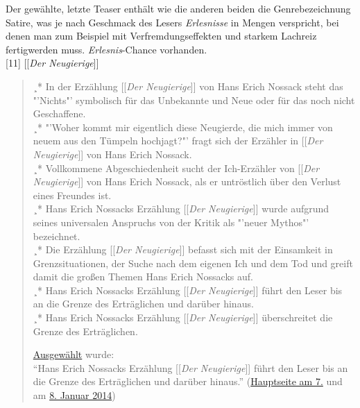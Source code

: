 \documentclass[fontsize=12pt]{scrartcl}
\begin{document}
Der gew\"ahlte, letzte Teaser enth\"alt wie die anderen beiden die Genrebe\-zeichnung Satire, was je nach Geschmack des Lesers\textsuperscript{\tiny *} \textit{Erlesnisse} in Mengen verspricht, bei denen man zum Beispiel mit Verfremdungseffekten und starkem Lachreiz fertigwerden muss. \textit{Erlesnis}-Chance vorhanden.\\

[11] [[\textit{Der Neugierige}]]
\singlespacing
\begin{quote}
¸* In der Erz\"ahlung [[\textit{Der Neugierige}]] von Hans Erich Nossack steht das "'Nichts"' sym\-bo\-lisch f\"ur das Unbekannte und Neue oder f\"ur das noch nicht Geschaffene.\\
¸* "'Woher kommt mir eigentlich diese Neugierde, die mich immer von neuem aus den T\"umpeln hochjagt?"' fragt sich der Erz\"ahler in [[\textit{Der Neugierige}]] von Hans Erich Nossack.\\
¸* Vollkommene Abgeschiedenheit sucht der Ich-Erz\"ahler von [[\textit{Der Neu\-gie\-ri\-ge}]] von Hans Erich Nossack, als er untr\"ostlich \"uber den Verlust eines Freundes ist.\\
¸* Hans Erich Nossacks Erz\"ahlung [[\textit{Der Neu\-gierige}]] wurde aufgrund seines universalen Anspruchs von der Kritik als "'neuer Mythos"' be\-zeichnet.\\
¸* Die Erz\"ahlung [[\textit{Der Neugierige}]] befasst sich mit der Einsamkeit in Grenzsituationen, der Suche nach dem eigenen Ich und dem Tod und greift damit die gro{\ss}en Themen Hans Erich Nossacks auf.\\
¸* Hans Erich Nossacks Erz\"ahlung [[\textit{Der Neugierige}]] f\"uhrt den Leser bis an die Grenze des Ertr\"aglichen und dar\"uber hinaus.\\
¸* Hans Erich Nossacks Erz\"ahlung [[\textit{Der Neugierige}]] \"uberschreitet die Grenze des Ertr\"aglichen.

\href{https://de.wikipedia.org/wiki/Wikipedia_Diskussion:Hauptseite/Schon_gewusst/Diskussionsarchiv/2013/Dezember#Vorschlag:_Der_Neugierige_.2811._Dezember_2013.29_.28erl..29}{Ausgew\"ahlt} wurde:\\
"`Hans Erich Nossacks Erz\"ahlung [[\textit{Der Neugierige}]] f\"uhrt den Leser bis an die Grenze des Ertr\"aglichen und dar\"uber hinaus."' (\href{https://de.wikipedia.org/wiki/Wikipedia:Hauptseite/Archiv/7._Januar_2014}{Hauptseite am 7.} und am \href{https://de.wikipedia.org/wiki/Wikipedia:Hauptseite/Archiv/8._Januar_2014}{8. Januar 2014})
\end{quote}
\onehalfspacing
\end{document}
